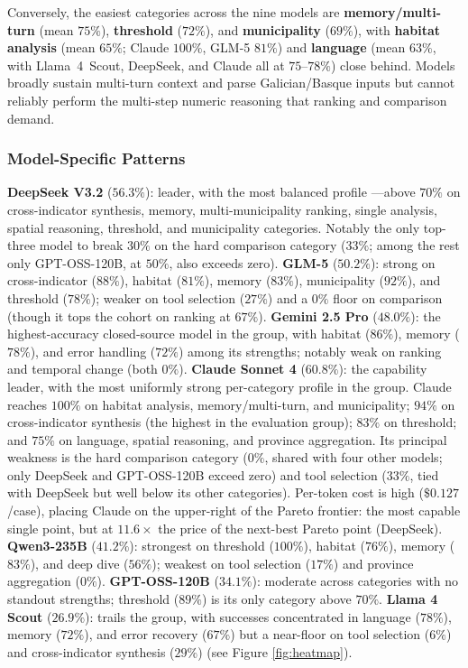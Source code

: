 \documentclass[sigconf]{acmart}
\begin{document}
Conversely, the easiest categories across the nine models are \textbf{memory/multi-turn} (mean $75\%$), \textbf{threshold} ($72\%$), and \textbf{municipality} ($69\%$), with \textbf{habitat analysis} (mean $65\%$; Claude $100\%$, GLM-5 $81\%$) and \textbf{language} (mean $63\%$, with Llama~4~Scout, DeepSeek, and Claude all at $75$--$78\%$) close behind. Models broadly sustain multi-turn context and parse Galician/Basque inputs but cannot reliably perform the multi-step numeric reasoning that ranking and comparison demand.

\subsubsection{Model-Specific Patterns}

\textbf{DeepSeek V3.2} ($56.3\%$): leader, with the most balanced profile ---above $70\%$ on cross-indicator synthesis, memory, multi-municipality ranking, single analysis, spatial reasoning, threshold, and municipality categories. Notably the only top-three model to break $30\%$ on the hard comparison category ($33\%$; among the rest only GPT-OSS-120B, at $50\%$, also exceeds zero). \textbf{GLM-5} ($50.2\%$): strong on cross-indicator ($88\%$), habitat ($81\%$), memory ($83\%$), municipality ($92\%$), and threshold ($78\%$); weaker on tool selection ($27\%$) and a $0\%$ floor on comparison (though it tops the cohort on ranking at $67\%$). \textbf{Gemini 2.5 Pro} ($48.0\%$): the highest-accuracy closed-source model in the group, with habitat ($86\%$), memory ($78\%$), and error handling ($72\%$) among its strengths; notably weak on ranking and temporal change (both $0\%$). \textbf{Claude Sonnet 4} ($60.8\%$): the capability leader, with the most uniformly strong per-category profile in the group. Claude reaches $100\%$ on habitat analysis, memory/multi-turn, and municipality; $94\%$ on cross-indicator synthesis (the highest in the evaluation group); $83\%$ on threshold; and $75\%$ on language, spatial reasoning, and province aggregation. Its principal weakness is the hard comparison category ($0\%$, shared with four other models; only DeepSeek and GPT-OSS-120B exceed zero) and tool selection ($33\%$, tied with DeepSeek but well below its other categories). Per-token cost is high ($\$0.127$/case), placing Claude on the upper-right of the Pareto frontier: the most capable single point, but at $11.6\times$ the price of the next-best Pareto point (DeepSeek). \textbf{Qwen3-235B} ($41.2\%$): strongest on threshold ($100\%$), habitat ($76\%$), memory ($83\%$), and deep dive ($56\%$); weakest on tool selection ($17\%$) and province aggregation ($0\%$). \textbf{GPT-OSS-120B} ($34.1\%$): moderate across categories with no standout strengths; threshold ($89\%$) is its only category above $70\%$. \textbf{Llama 4 Scout} ($26.9\%$): trails the group, with successes concentrated in language ($78\%$), memory ($72\%$), and error recovery ($67\%$) but a near-floor on tool selection ($6\%$) and cross-indicator synthesis ($29\%$) (see Figure \ref{fig:heatmap}).
\end{document}
